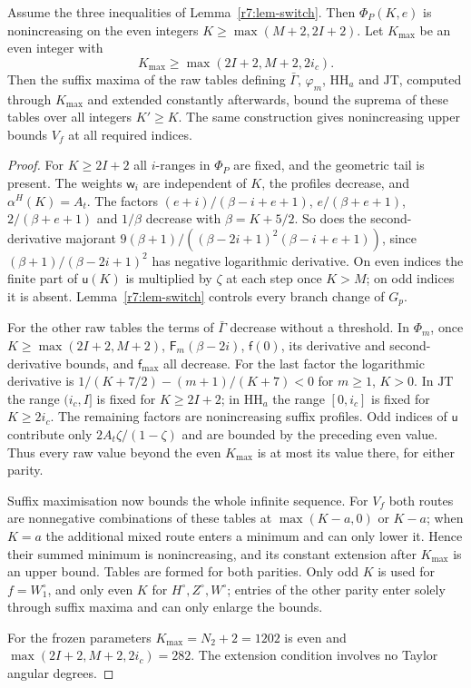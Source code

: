 \begin{lemma}\label{r7:lem-extension}
Assume the three inequalities of Lemma~\ref{r7:lem-switch}. Then $\Phi_P(K,e)$ is nonincreasing on the even integers $K\geq\max(M+2,2I+2)$. Let $K_{\max}$ be an even integer with
\[
K_{\max}\geq\max(2I+2,M+2,2i_c).
\]
Then the suffix maxima of the raw tables defining $\bar\Gamma$, $\varphi_m$, $\mathrm{HH}_a$ and $\mathrm{JT}$, computed through $K_{\max}$ and extended constantly afterwards, bound the suprema of these tables over all integers $K'\geq K$. The same construction gives nonincreasing upper bounds $V_f$ at all required indices.
\end{lemma}
\begin{proof}
For $K\geq2I+2$ all $i$-ranges in $\Phi_P$ are fixed, and the geometric tail is present. The weights $\mathsf w_i$ are independent of $K$, the profiles decrease, and $\alpha^H(K)=A_t$. The factors $(e+i)/(\beta-i+e+1)$, $e/(\beta+e+1)$, $2/(\beta+e+1)$ and $1/\beta$ decrease with $\beta=K+5/2$. So does the second-derivative majorant $9(\beta+1)/((\beta-2i+1)^2(\beta-i+e+1))$, since $(\beta+1)/(\beta-2i+1)^2$ has negative logarithmic derivative. On even indices the finite part of $\mathsf u(K)$ is multiplied by $\zeta$ at each step once $K>M$; on odd indices it is absent. Lemma~\ref{r7:lem-switch} controls every branch change of $G_p$.

For the other raw tables the terms of $\bar\Gamma$ decrease without a threshold. In $\Phi_m$, once $K\geq\max(2I+2,M+2)$, $\mathsf F_m(\beta-2i)$, $\mathsf f(0)$, its derivative and second-derivative bounds, and $\mathsf f_{\max}$ all decrease. For the last factor the logarithmic derivative is $1/(K+7/2)-(m+1)/(K+7)<0$ for $m\geq1$, $K>0$. In $\mathrm{JT}$ the range $(i_c,I]$ is fixed for $K\geq2I+2$; in $\mathrm{HH}_a$ the range $[0,i_c]$ is fixed for $K\geq2i_c$. The remaining factors are nonincreasing suffix profiles. Odd indices of $\mathsf u$ contribute only $2A_t\zeta/(1-\zeta)$ and are bounded by the preceding even value. Thus every raw value beyond the even $K_{\max}$ is at most its value there, for either parity.

Suffix maximisation now bounds the whole infinite sequence. For $V_f$ both routes are nonnegative combinations of these tables at $\max(K-a,0)$ or $K-a$; when $K=a$ the additional mixed route enters a minimum and can only lower it. Hence their summed minimum is nonincreasing, and its constant extension after $K_{\max}$ is an upper bound. Tables are formed for both parities. Only odd $K$ is used for $f=W_1^\circ$, and only even $K$ for $H^\circ,Z^\circ,W^\circ$; entries of the other parity enter solely through suffix maxima and can only enlarge the bounds.

For the frozen parameters $K_{\max}=N_2+2=1202$ is even and $\max(2I+2,M+2,2i_c)=282$. The extension condition involves no Taylor angular degrees.
\end{proof}

